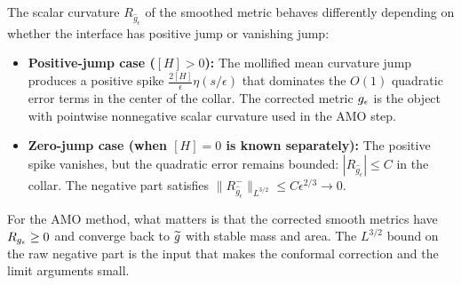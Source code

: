 \begin{center}
\end{center}

\begin{remark}\label{rmk:SmoothedScalarCurvature}
The scalar curvature $R_{\hat{g}_\epsilon}$ of the smoothed metric behaves differently depending on whether the interface has positive jump or vanishing jump:
\begin{itemize}
    \item \textbf{Positive-jump case ($[H] > 0$):} The mollified mean curvature jump produces a positive spike $\frac{2[H]}{\epsilon}\eta(s/\epsilon)$ that dominates the $O(1)$ quadratic error terms in the center of the collar. The corrected metric $g_{\epsilon}$ is the object with pointwise nonnegative scalar curvature used in the AMO step.
    \item \textbf{Zero-jump case (when $[H] = 0$ is known separately):} The positive spike vanishes, but the quadratic error remains bounded: $|R_{\hat{g}_\epsilon}| \le C$ in the collar. The negative part satisfies $\|R^-_{\hat{g}_\epsilon}\|_{L^{3/2}} \le C\epsilon^{2/3} \to 0$.
\end{itemize}
For the AMO method, what matters is that the corrected smooth metrics have \(R_{g_{\epsilon}}\ge0\) and converge back to \(\widetilde{g}\) with stable mass and area. The \(L^{3/2}\) bound on the raw negative part is the input that makes the conformal correction and the limit arguments small.
\end{remark}

